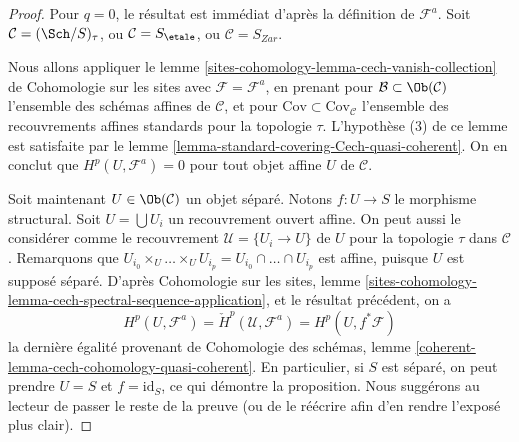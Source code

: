 \begin{proof}
Pour $q = 0$, le résultat est immédiat d'après la définition de
$\mathcal{F}^a$. Soit $\mathcal{C} = (\Sch/S)_\tau$, ou
$\mathcal{C} = S_\etale$, ou $\mathcal{C} = S_{Zar}$.

\medskip\noindent
Nous allons appliquer le lemme
\ref{sites-cohomology-lemma-cech-vanish-collection} de Cohomologie sur les
sites avec $\mathcal{F} = \mathcal{F}^a$, en prenant pour
$\mathcal{B} \subset \Ob(\mathcal{C})$ l'ensemble des schémas affines de
$\mathcal{C}$, et pour $\text{Cov} \subset \text{Cov}_\mathcal{C}$
l'ensemble des recouvrements affines standards pour la topologie $\tau$.
L'hypothèse (3) de ce lemme est satisfaite par le lemme
\ref{lemma-standard-covering-Cech-quasi-coherent}. On en conclut que
$H^p(U, \mathcal{F}^a) = 0$ pour tout objet affine $U$ de $\mathcal{C}$.

\medskip\noindent
Soit maintenant $U \in \Ob(\mathcal{C})$ un objet séparé. Notons
$f : U \to S$ le morphisme structural. Soit $U = \bigcup U_i$ un
recouvrement ouvert affine. On peut aussi le considérer comme le
recouvrement $\mathcal{U} = \{U_i \to U\}$ de $U$ pour la topologie $\tau$ dans
$\mathcal{C}$. Remarquons que
$U_{i_0} \times_U \ldots \times_U U_{i_p} =
U_{i_0} \cap \ldots \cap U_{i_p}$ est affine, puisque $U$ est supposé
séparé. D'après Cohomologie sur les sites, lemme
\ref{sites-cohomology-lemma-cech-spectral-sequence-application}, et le
résultat précédent, on a
$$
H^p(U, \mathcal{F}^a) = \check{H}^p(\mathcal{U}, \mathcal{F}^a)
= H^p(U, f^*\mathcal{F})
$$
la dernière égalité provenant de Cohomologie des schémas, lemme
\ref{coherent-lemma-cech-cohomology-quasi-coherent}. En particulier, si
$S$ est séparé, on peut prendre $U = S$ et $f = \text{id}_S$, ce qui
démontre la proposition. Nous suggérons au lecteur de passer le reste de
la preuve (ou de le réécrire afin d'en rendre l'exposé plus clair).


\end{proof}
